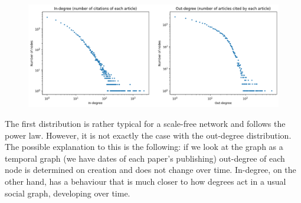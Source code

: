 \documentclass{article}
\begin{document}
\begin{figure}[h]
\centering
\includegraphics[width=1\linewidth]{degree_distribution.png}
\end{figure}
\newpage
The first distribution is rather typical for a scale-free network and follows the power law. However, it is not exactly the case with the out-degree distribution. The possible explanation to this is the following: if we look at the graph as a temporal graph (we have dates of each paper's publishing) out-degree of each node is determined on creation and does not change over time. In-degree, on the other hand, has a behaviour that is much closer to how degrees act in a usual social graph, developing over time.
\end{document}
